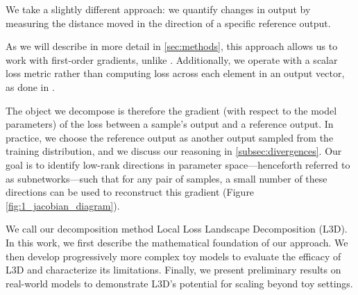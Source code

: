 \documentclass{article}
\theoremstyle{plain}
\theoremstyle{definition}
\theoremstyle{remark}
\begin{document}
We take a slightly different approach: we quantify changes in output by measuring the distance moved in the direction of a specific reference output.

As we will describe in more detail in \ref{sec:methods}, this approach allows us to work with first-order gradients, unlike \cite{matena2023npeff}. Additionally, we operate with a scalar loss metric rather than computing loss across each element in an output vector, as done in \cite{braun2025interpretability}.

The object we decompose is therefore the gradient (with respect to the model parameters) of the loss between a sample's output and a reference output. In practice, we choose the reference output as another output sampled from the training distribution, and we discuss our reasoning in \ref{subsec:divergences}. Our goal is to identify low-rank directions in parameter space—henceforth referred to as subnetworks—such that for any pair of samples, a small number of these directions can be used to reconstruct this gradient (Figure \ref{fig:1_jacobian_diagram}).

We call our decomposition method Local Loss Landscape Decomposition (L3D). In this work, we first describe the mathematical foundation of our approach. We then develop progressively more complex toy models to evaluate the efficacy of L3D and characterize its limitations. Finally, we present preliminary results on real-world models to demonstrate L3D’s potential for scaling beyond toy settings.


\end{document}
